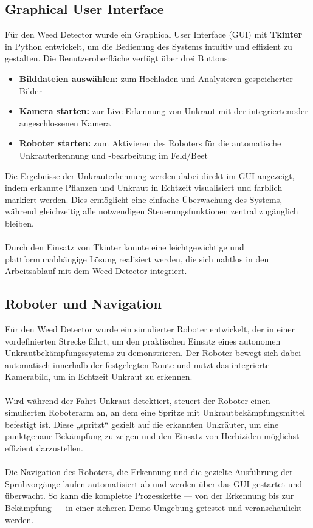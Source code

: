 \documentclass[12pt]{scrartcl}
\begin{document}
\subsection{Graphical User Interface}
Für den Weed Detector wurde ein Graphical User Interface (GUI) mit \textbf{Tkinter} in Python entwickelt, um die Bedienung des Systems intuitiv und effizient zu gestalten. Die Benutzeroberfläche verfügt über drei Buttons:
\begin{itemize}
    \item \textbf{Bilddateien auswählen:} zum Hochladen und Analysieren gespeicherter Bilder
    \item \textbf{Kamera starten:} zur Live-Erkennung von Unkraut mit der integriertenoder angeschlossenen Kamera
    \item \textbf{Roboter starten:} zum Aktivieren des Roboters für die automatische Unkrauterkennung und -bearbeitung im Feld/Beet
\end{itemize}
Die Ergebnisse der Unkrauterkennung werden dabei direkt im GUI angezeigt, indem erkannte Pflanzen und Unkraut in Echtzeit visualisiert und farblich markiert werden. Dies ermöglicht eine einfache Überwachung des Systems, während gleichzeitig alle notwendigen Steuerungsfunktionen zentral zugänglich bleiben.\\
\\
Durch den Einsatz von Tkinter konnte eine leichtgewichtige und plattformunabhängige Lösung realisiert werden, die sich nahtlos in den Arbeitsablauf mit dem Weed Detector integriert.

\subsection{Roboter und Navigation}
Für den Weed Detector wurde ein simulierter Roboter entwickelt, der in einer vordefinierten Strecke fährt, um den praktischen Einsatz eines autonomen Unkrautbekämpfungssystems zu demonstrieren. Der Roboter bewegt sich dabei automatisch innerhalb der festgelegten Route und nutzt das integrierte Kamerabild, um in Echtzeit Unkraut zu erkennen.\\
\\
Wird während der Fahrt Unkraut detektiert, steuert der Roboter einen simulierten Roboterarm an, an dem eine Spritze mit Unkrautbekämpfungsmittel befestigt ist. Diese „spritzt“ gezielt auf die erkannten Unkräuter, um eine punktgenaue Bekämpfung zu zeigen und den Einsatz von Herbiziden möglichst effizient darzustellen.\\
\\
Die Navigation des Roboters, die Erkennung und die gezielte Ausführung der Sprühvorgänge laufen automatisiert ab und werden über das GUI gestartet und überwacht. So kann die komplette Prozesskette — von der Erkennung bis zur Bekämpfung — in einer sicheren Demo-Umgebung getestet und veranschaulicht werden.
\end{document}
